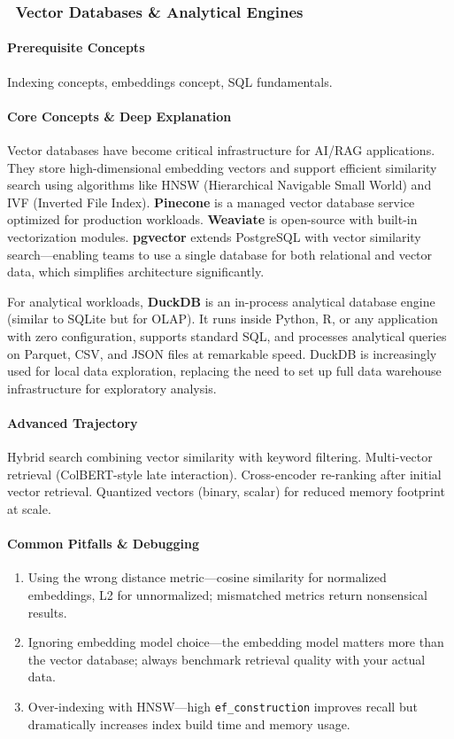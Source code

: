 \documentclass[11pt, a4paper, oneside]{report}
\newcommand{\awareness}[1]{\subsubsection{\texorpdfstring{\fcolorbox{gray!50}{gray!10}{\footnotesize\bfseries\color{gray!50!black} AWARENESS}~#1}{#1}}}
\begin{document}
\awareness{Vector Databases \& Analytical Engines}

\paragraph{Prerequisite Concepts} Indexing concepts, embeddings concept, SQL fundamentals.

\paragraph{Core Concepts \& Deep Explanation} Vector databases have become critical infrastructure for AI/RAG applications. They store high-dimensional embedding vectors and support efficient similarity search using algorithms like HNSW (Hierarchical Navigable Small World) and IVF (Inverted File Index). \textbf{Pinecone} is a managed vector database service optimized for production workloads. \textbf{Weaviate} is open-source with built-in vectorization modules. \textbf{pgvector} extends PostgreSQL with vector similarity search---enabling teams to use a single database for both relational and vector data, which simplifies architecture significantly.

For analytical workloads, \textbf{DuckDB} is an in-process analytical database engine (similar to SQLite but for OLAP). It runs inside Python, R, or any application with zero configuration, supports standard SQL, and processes analytical queries on Parquet, CSV, and JSON files at remarkable speed. DuckDB is increasingly used for local data exploration, replacing the need to set up full data warehouse infrastructure for exploratory analysis.

\paragraph{Advanced Trajectory} Hybrid search combining vector similarity with keyword filtering. Multi-vector retrieval (ColBERT-style late interaction). Cross-encoder re-ranking after initial vector retrieval. Quantized vectors (binary, scalar) for reduced memory footprint at scale.

\paragraph{Common Pitfalls \& Debugging}
\begin{enumerate}[leftmargin=*]
\item Using the wrong distance metric---cosine similarity for normalized embeddings, L2 for unnormalized; mismatched metrics return nonsensical results.
\item Ignoring embedding model choice---the embedding model matters more than the vector database; always benchmark retrieval quality with your actual data.
\item Over-indexing with HNSW---high \texttt{ef\_construction} improves recall but dramatically increases index build time and memory usage.
\end{enumerate}
\end{document}
